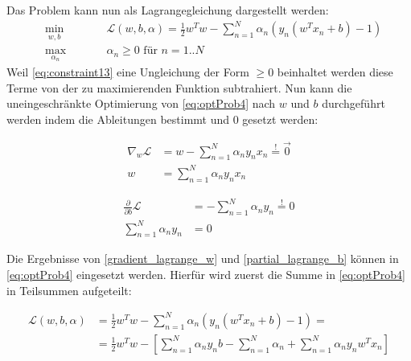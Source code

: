 \documentclass[a4paper,11pt,twoside]{scrreprt}
\newcommand{\Lagr}{\mathcal{L}}
\begin{document}
Das Problem kann nun als Lagrangegleichung dargestellt werden:
\begin{subequations}
	\begin{alignat}{2}
		&\!\min_{w, b}        &\qquad&  \Lagr (w, b, \alpha) = \frac{1}{2} w^{T} w - \sum_{n=1}^{N} \alpha_{n} (y_n (w^{T} x_{n} + b)-1) \label{eq:optProb4}\\
		&\max_{\alpha_{n}} &      & \alpha_{n} \geq 0 \text{ für } n=1..N \label{eq:constraint14}
	\end{alignat}
\end{subequations}
 Weil \autoref{eq:constraint13} eine Ungleichung der Form $\geq 0$ beinhaltet werden diese Terme von der zu maximierenden Funktion subtrahiert. Nun kann die uneingeschränkte Optimierung von \autoref{eq:optProb4} nach $w$ und $b$ durchgeführt werden indem die Ableitungen bestimmt und $0$ gesetzt werden:

\begin{equation} \label{gradient_lagrange_w}
	\begin{aligned}
		\nabla_{w} \Lagr &= w - \sum_{n=1}^{N} \alpha_{n} y_{n} x_{n} \overset{!}{=} \vec{0} \\
		w &= \sum_{n=1}^{N} \alpha_{n} y_{n} x_{n}
	\end{aligned}
\end{equation}

\begin{equation} \label{partial_lagrange_b}
	\begin{aligned}
		\frac{\partial}{\partial b} \Lagr &= - \sum_{n=1}^{N} \alpha_{n} y_{n} \overset{!}{=} 0 \\
		\sum_{n=1}^{N} \alpha_{n} y_{n} &= 0
	\end{aligned}
\end{equation}

Die Ergebnisse von \autoref{gradient_lagrange_w} und \autoref{partial_lagrange_b} können in \autoref{eq:optProb4} eingesetzt werden. Hierfür wird zuerst die Summe in \autoref{eq:optProb4} in Teilsummen aufgeteilt:

\begin{equation} \label{lagrange_substituted}
	\begin{aligned}
		\Lagr(w, b, \alpha) &= \frac{1}{2} w^{T} w - \sum_{n=1}^{N} \alpha_{n} (y_n (w^{T} x_{n} + b)-1) = \\
		&= \frac{1}{2} w^{T} w - [\sum_{n=1}^{N} \alpha_{n} y_{n} b - \sum_{n=1}^{N} \alpha_{n} + \sum_{n=1}^{N} \alpha_{n} y_{n} w^{T} x_{n}]
	\end{aligned}
\end{equation}
\end{document}

